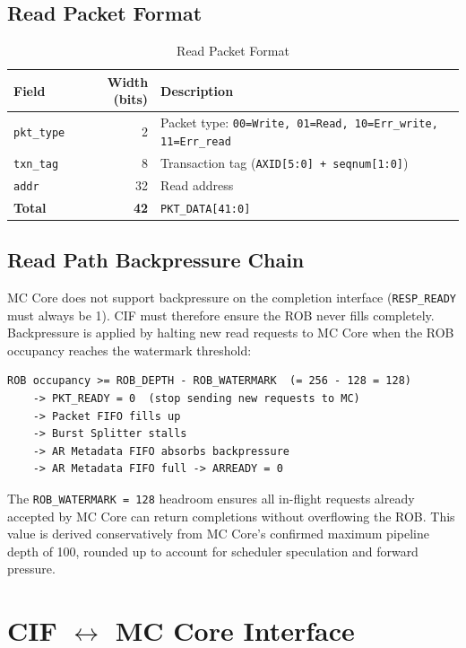 \subsection{Read Packet Format}

\begin{table}[h]
\centering
\begin{tabular}{lrl}
\toprule
\textbf{Field} & \textbf{Width (bits)} & \textbf{Description} \\
\midrule
\texttt{pkt\_type} & 2  & Packet type: \texttt{00=Write, 01=Read, 10=Err\_write, 11=Err\_read} \\
\texttt{txn\_tag}  & 8  & Transaction tag (\texttt{AXID[5:0] + seqnum[1:0]}) \\
\texttt{addr}      & 32 & Read address \\
\midrule
\textbf{Total}     & \textbf{42} & \texttt{PKT\_DATA[41:0]} \\
\bottomrule
\end{tabular}
\caption{Read Packet Format}
\end{table}

\subsection{Read Path Backpressure Chain}

MC Core does not support backpressure on the completion interface (\texttt{RESP\_READY} must always be 1). CIF must therefore ensure the ROB never fills completely. Backpressure is applied by halting new read requests to MC Core when the ROB occupancy reaches the watermark threshold:

\begin{lstlisting}
ROB occupancy >= ROB_DEPTH - ROB_WATERMARK  (= 256 - 128 = 128)
    -> PKT_READY = 0  (stop sending new requests to MC)
    -> Packet FIFO fills up
    -> Burst Splitter stalls
    -> AR Metadata FIFO absorbs backpressure
    -> AR Metadata FIFO full -> ARREADY = 0
\end{lstlisting}
The \texttt{ROB\_WATERMARK = 128} headroom ensures all in-flight requests already accepted by MC Core can return completions without overflowing the ROB. This value is derived conservatively from MC Core's confirmed maximum pipeline depth of 100, rounded up to account for scheduler speculation and forward pressure.
\section{CIF \texorpdfstring{$\leftrightarrow$}{<->} MC Core Interface}

